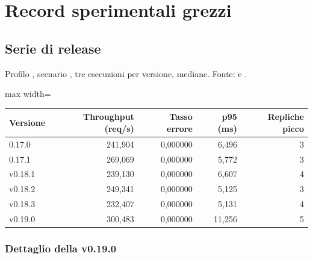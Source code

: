 \chapter{Record sperimentali grezzi}
\label{cap:D-record-sperimentali}

\section{Serie di release}

Profilo , scenario
, tre esecuzioni per versione, mediane.
Fonte:  e
.

\begin{center}
\small
\begin{adjustbox}{max width=\textwidth}
\begin{tabular}{@{}lrrrr@{}}
\toprule
\textbf{Versione} & \textbf{Throughput (req/s)} & \textbf{Tasso errore} &
\textbf{p95 (ms)} & \textbf{Repliche picco} \\
\midrule
0.17.0  & 241{,}904 & 0{,}000000 & 6{,}496  & 3 \\
0.17.1  & 269{,}069 & 0{,}000000 & 5{,}772  & 3 \\
v0.18.1 & 239{,}130 & 0{,}000000 & 6{,}607  & 4 \\
v0.18.2 & 249{,}341 & 0{,}000000 & 5{,}125  & 3 \\
v0.18.3 & 232{,}407 & 0{,}000000 & 5{,}131  & 4 \\
v0.19.0 & 300{,}483 & 0{,}000000 & 11{,}256 & 5 \\
\bottomrule
\end{tabular}
\end{adjustbox}
\end{center}

\subsection{Dettaglio della v0.19.0}

